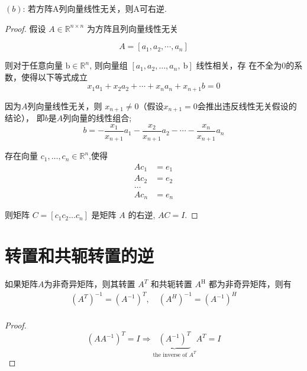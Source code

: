 \begin{theorem}
    $(b)$: 若方阵A列向量线性无关，则A可右逆. 
\end{theorem}

\begin{proof}
    假设 $ A \in \mathbb{R}^{n \times n} $ 为方阵且列向量线性无关 
    
    $$ A=\left[a_{1}, a_{2}, \cdots, a_{n}\right] $$

    则对于任意向量 $ \mathrm{b} \in \mathbb{R}^{n} $, 则向量组 $ \left[a_{1}, a_{2}, \ldots, a_{n}, \mathrm{~b}\right] $ 线性相关，存 在不全为0的系数，使得以下等式成立
    $$
    x_{1} a_{1}+x_{2} a_{2}+\cdots+x_{n} a_{n}+x_{n+1} b=0
    $$

    因为$A$列向量线性无关，则 $ x_{n+1} \neq 0 $（假设$ x_{n+1} = 0 $会推出违反线性无关假设的结论）， 即$b$是$A$列向量的线性组合;
    $$
    b=-\frac{x_{1}}{x_{n+1}} a_{1}-\frac{x_{2}}{x_{n+1}} a_{2}-\cdots-\frac{x_{n}}{x_{n+1}} a_{n}
    $$

    存在向量 $ c_{1}, \ldots, c_{n} \in \mathbb{R}^{n} $,使得 
    $$
    \begin{aligned}
        Ac _{1}&=e_{1}\\
         A c_{2}&=e_{2}\\
          \ldots \\
          A c_{n}&=e_{n}
    \end{aligned}
    $$

    则矩阵 $ C=\left[c_{1} c_{2} \ldots c_{n}\right] $ 是矩阵 $ A $ 的右逆, $ A C=I $.

\end{proof}

\section{转置和共轭转置的逆}

\begin{theorem}
    如果矩阵$A$为非奇异矩阵，则其转置 $ A^{T} $ 和共轭转置 $ A^{\mathrm{H}} $ 都为非奇异矩阵，则有
$$
\begin{array}{l}
\left(A^{T}\right)^{-1}=\left(A^{-1}\right)^{T}, \quad\left(A^{H}\right)^{-1}=\left(A^{-1}\right)^{H} \\
\end{array}
$$
\end{theorem}

\begin{proof}
    $$\left(A A^{-1}\right)^{T}=I \Rightarrow \underbrace{\left(A^{-1}\right)^{T}}_{\text{the inverse of }A^T}   A^{T}=I$$
\end{proof}

